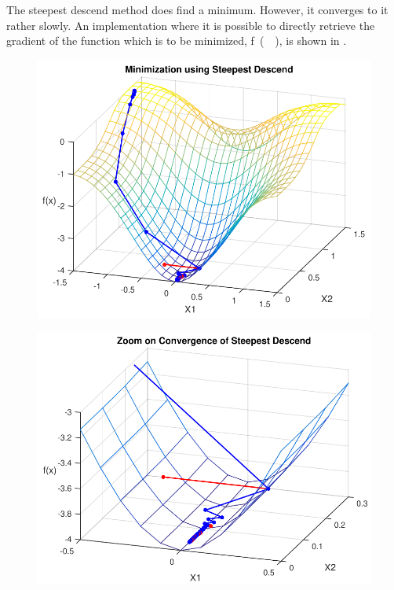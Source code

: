 The steepest descend method does find a minimum. However, it converges to it rather slowly. An implementation where it is possible to directly retrieve the gradient of the function which is to be minimized, \si{f()}, is shown in .

\begin{minipage}{\linewidth}
	\begin{minipage}{0.45\linewidth}
		\begin{figure}[H]
			\includegraphics[scale=.6]{figures/steepestDescendEx}
			\centering
			\captionsetup{justification=centering}
			\label{steepestDescendEx}
		\end{figure}
	\end{minipage}
	\hspace{0.03\linewidth}
	\begin{minipage}{0.45\linewidth}
		\begin{figure}[H]
			\includegraphics[scale=.6]{figures/steepestDesendExZoom}

\end{figure}
\end{minipage}
\end{minipage}
